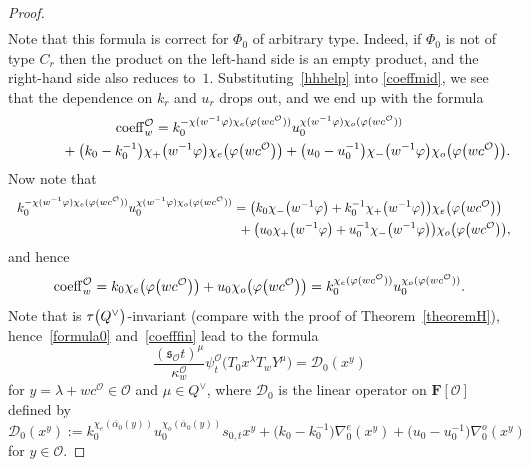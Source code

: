 \documentclass[11pt]{article}
\numberwithin{equation}{section}
\numberwithin{equation}{section}
\begin{document}
\begin{proof}
\begin{gather*}
\end{gather*}
Note that this formula is correct for $\Phi_0$ of arbitrary type. Indeed, if $\Phi_0$ is not of type $C_r$ then the product on the left-hand side is an empty product, and the right-hand side also reduces to~$1$.
Substituting~\eqref{hhhelp} into
\eqref{coeffmid}, we see that
the dependence on $k_r$ and $u_r$ drops out, and we end up with the formula
\begin{gather*}
{\rm coeff}_w^\mathcal{O}=k_0^{-\chi(w^{-1}\varphi)\chi_e(\varphi(wc^\mathcal{O}))}
u_0^{\chi(w^{-1}\varphi)\chi_o(\varphi(wc^\mathcal{O}))}\\
\hphantom{{\rm coeff}_w^\mathcal{O}=}{}
+\bigl(k_0-k_0^{-1}\bigr)\chi_+\bigl(w^{-1}\varphi\bigr)\chi_e\bigl(\varphi\bigl(wc^\mathcal{O}\bigr)\bigr)+
\bigl(u_0-u_0^{-1}\bigr)\chi_-\bigl(w^{-1}\varphi\bigr)\chi_o\bigl(\varphi\bigl(wc^\mathcal{O}\bigr)\bigr).
\end{gather*}
Now note that
\begin{gather*}
k_0^{-\chi(w^{-1}\varphi)\chi_e(\varphi(wc^\mathcal{O}))}
u_0^{\chi(w^{-1}\varphi)\chi_o(\varphi(wc^\mathcal{O}))}=\bigl(k_0\chi_-\bigl(w^{-1}\varphi\bigr)+k_0^{-1}\chi_+\bigl(w^{-1}\varphi\bigr)\bigr)\chi_e \bigl(\varphi\bigl(wc^\mathcal{O}\bigr)\bigr)\\
\hphantom{k_0^{-\chi(w^{-1}\varphi)\chi_e(\varphi(wc^\mathcal{O}))}
u_0^{\chi(w^{-1}\varphi)\chi_o(\varphi(wc^\mathcal{O}))}=}{}
+\bigl(u_0\chi_+\bigl(w^{-1}\varphi\bigr)+u_0^{-1}\chi_-\bigl(w^{-1}\varphi\bigr)\bigr)\chi_o\bigl(\varphi\bigl(wc^\mathcal{O}\bigr)\bigr),
\end{gather*}
and hence
\begin{equation}\label{coefffin}
{\rm coeff}_w^\mathcal{O}=k_0\chi_e\bigl(\varphi\bigl(wc^\mathcal{O}\bigr)\bigr)+u_0\chi_o\bigl(\varphi\bigl(wc^\mathcal{O}\bigr)\bigr)=
k_0^{\chi_e(\varphi(wc^\mathcal{O}))}u_0^{\chi_o(\varphi(wc^\mathcal{O}))}.
\end{equation}
Note that  is $\tau\smash{\bigl(Q^\vee\bigr)}$-invariant (compare with the proof of Theorem~\ref{theoremH}),
hence~\eqref{formula0} and~\eqref{coefffin} lead to the formula
\begin{equation*}
\frac{(\mathfrak{s}_\mathcal{O}t)^\mu}{\kappa_w^\mathcal{O}}\psi_{t}^\mathcal{O}\bigl(T_0x^\lambda T_wY^\mu\bigr)=\mathcal{D}_0(x^y)
\end{equation*}
for $y=\lambda+wc^\mathcal{O}\in\mathcal{O}$ and $\mu\in Q^\vee$, where $\mathcal{D}_0$ is the linear operator on $\mathbf{F}[\mathcal{O}]$ defined by
\[
\mathcal{D}_0(x^y):=
k_0^{\chi_e(\overline{\alpha}_0(y))}u_0^{\chi_o(\overline{\alpha}_0(y))}s_{0,t}x^y+\bigl(k_0-k_0^{-1}\bigr)\nabla_0^e(x^y)+\bigl(u_0-u_0^{-1}\bigr)\nabla_0^o(x^y)
\]
for $y\in\mathcal{O}$.


\end{proof}
\end{document}

